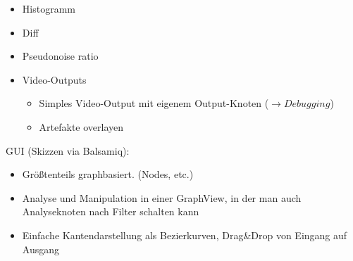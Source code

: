 \documentclass{article}
\begin{document}
\begin{itemize}
\begin{itemize}
\begin{itemize}
                    \end{itemize}
            \end{itemize}
        \item Histogramm
        \item Diff
        \item Pseudonoise ratio
        \item Video-Outputs
            \begin{itemize}
                \item Simples Video-Output mit eigenem Output-Knoten ($\rightarrow Debugging$)
                \item Artefakte overlayen
            \end{itemize}
    \end{itemize}
GUI (Skizzen via Balsamiq):
    \begin{itemize}
        \item Größtenteils graphbasiert. (Nodes, etc.)
        \item Analyse und Manipulation in einer GraphView, in der man auch Analyseknoten nach Filter schalten kann
        \item Einfache Kantendarstellung als Bezierkurven, Drag\&Drop von Eingang auf Ausgang
    \end{itemize}
\end{document}
